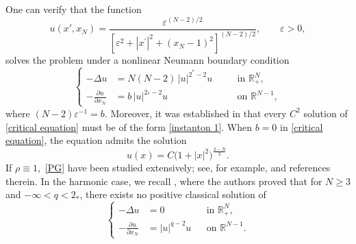 \documentclass[12pt,reqno]{amsart}
\begin{document}
One can verify that the function  
\begin{equation}\label{instanton 1}
u(x',x_N) = 
\frac{\varepsilon^{(N-2)/2}}
     {\left[\varepsilon^2 + |x^\prime|^2 + (x_N - 1)^2 \right]^{(N-2)/2}},
\qquad \varepsilon > 0,
\end{equation}
solves the problem under a nonlinear Neumann boundary condition
\begin{equation}\label{critical equation}
\left\{
\begin{aligned}
   -\Delta u &= N(N-2)\,|u|^{2^\ast-2}u 
   &\quad &\text{in } \mathds{R}^N_+, \\[0.3em]
   -\frac{\partial u}{\partial x_N} &= b\,|u|^{2_\ast-2}u 
   &\quad &\text{on } \mathds{R}^{N-1},
\end{aligned}
\right.
\end{equation}
where $(N-2)\varepsilon^{-1} = b$.  
Moreover, it was established in \cite{Escobar2, Li-Zhu} that every $C^2$ solution of \eqref{critical equation} must be of the form \eqref{instanton 1}.
When $b=0$ in \eqref{critical equation}, the equation admits the solution
\[
u(x) = C \bigl(1 + |x|^2\bigr)^{\frac{2-N}{2}}.
\]  
If $\rho \equiv 1,$  \eqref{PG} have been studied extensively; see, for example, \cite{Chipot-Fila-Shafir1,Chipot-Fila-Shafir2, YanYan-Lei} and references therein.  
In the harmonic case, we recall \cite[Corollary~1.1]{YanYan-Lei}, where the authors proved that for $N \geq 3$ and $-\infty < q < 2_\ast$, there exists no positive classical solution of  
\begin{equation}\label{Coro1}
\left\{
\begin{aligned}
	-\Delta u &= 0 &&\text{in } \mathds{R}^N_+, \\
	-\frac{\partial u}{\partial x_N} &= |u|^{q-2}u &&\text{on } \mathds{R}^{N-1}.
\end{aligned}
\right.
\end{equation}
\end{document}
